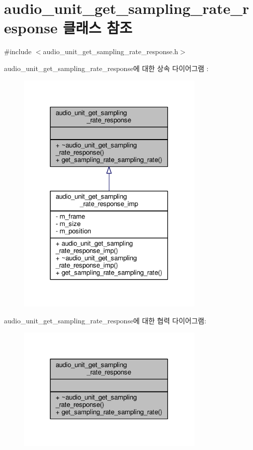 \hypertarget{classavdecc__lib_1_1audio__unit__get__sampling__rate__response}{}\section{audio\+\_\+unit\+\_\+get\+\_\+sampling\+\_\+rate\+\_\+response 클래스 참조}
\label{classavdecc__lib_1_1audio__unit__get__sampling__rate__response}


{\ttfamily \#include $<$audio\+\_\+unit\+\_\+get\+\_\+sampling\+\_\+rate\+\_\+response.\+h$>$}



audio\+\_\+unit\+\_\+get\+\_\+sampling\+\_\+rate\+\_\+response에 대한 상속 다이어그램 \+: 
\nopagebreak
\begin{figure}[H]
\begin{center}
\leavevmode
\includegraphics[width=257pt]{classavdecc__lib_1_1audio__unit__get__sampling__rate__response__inherit__graph}
\end{center}
\end{figure}


audio\+\_\+unit\+\_\+get\+\_\+sampling\+\_\+rate\+\_\+response에 대한 협력 다이어그램\+:
\nopagebreak
\begin{figure}[H]
\begin{center}
\leavevmode
\includegraphics[width=257pt]{classavdecc__lib_1_1audio__unit__get__sampling__rate__response__coll__graph}
\end{center}
\end{figure}
